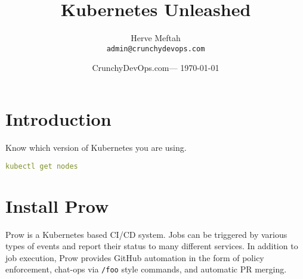 \documentclass{article}
\title{Kubernetes Unleashed } %
\author{Herve Meftah\\ \texttt{admin@crunchydevops.com}} %
\date{CrunchyDevOps.com--- \today} %
\begin{document}
\maketitle %


\section*{Introduction} %


\begin{info} %
	Know which version of Kubernetes you are using.
\begin{file}[command]
\begin{lstlisting}[language=Yaml]
kubectl get nodes
\end{lstlisting}
\end{file}
\end{info}


\section{Install Prow} %
Prow is a Kubernetes based CI/CD system. Jobs can be triggered by various types of events and report their status to many different services.
In addition to job execution, Prow provides GitHub automation in the form of policy enforcement, chat-ops via \texttt{/foo} style commands,
and automatic PR merging.

\end{document}
